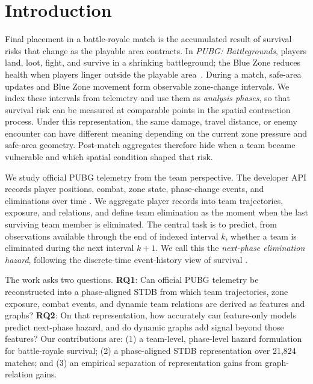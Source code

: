 \section{Introduction}

Final placement in a battle-royale match is the accumulated result of
survival risks that change as the playable area contracts. In
\textit{PUBG: Battlegrounds}, players land, loot, fight, and survive in a
shrinking battleground; the Blue Zone reduces health when players linger
outside the playable area~\cite{pubgGameInfo}. During a match, safe-area
updates and Blue Zone movement form observable zone-change intervals. We
index these intervals from telemetry and use them as \textit{analysis
phases}, so that survival risk can be measured at comparable points in the
spatial contraction process. Under this representation, the same damage,
travel distance, or enemy encounter can have different meaning depending on
the current zone pressure and safe-area geometry. Post-match aggregates
therefore hide when a team became vulnerable and which spatial condition
shaped that risk.

We study official PUBG telemetry from the team perspective. The developer API
records player positions, combat, zone state, phase-change events, and
eliminations over time
\cite{pubgDeveloperPortal,pubgTelemetryEvents,pubgTelemetryObjects}. We
aggregate player records into team trajectories, exposure, and relations, and
define team elimination as the moment when the last surviving team member is
eliminated. The central task is to predict, from observations available
through the end of indexed interval \(k\), whether a team is eliminated during
the next interval \(k+1\). We call this the \textit{next-phase elimination
hazard}, following the discrete-time event-history view of survival
\cite{allison1982discrete,singer1993discrete}.

The work asks two questions. \textbf{RQ1}: Can official PUBG telemetry be
reconstructed into a phase-aligned STDB from which team trajectories, zone
exposure, combat events, and dynamic team relations are derived as features
and graphs? \textbf{RQ2}: On that representation, how accurately can
feature-only models predict next-phase hazard, and do dynamic graphs add
signal beyond those features? Our contributions are: (1) a team-level,
phase-level hazard formulation for battle-royale survival; (2) a
phase-aligned STDB representation over 21,824 matches; and (3) an empirical
separation of representation gains from graph-relation gains.
